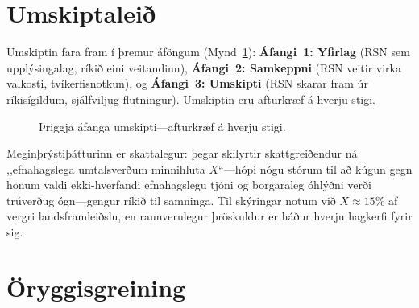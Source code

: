 \documentclass[11pt,a4paper,twocolumn]{article}
\begin{document}
\section{Umskiptaleið}

Umskiptin fara fram í þremur áföngum (Mynd~\ref{fig:migration}): \textbf{Áfangi~1: Yfirlag} (RSN sem upplýsingalag, ríkið eini veitandinn), \textbf{Áfangi~2: Samkeppni} (RSN veitir virka valkosti, tvíkerfisnotkun), og \textbf{Áfangi~3: Umskipti} (RSN skarar fram úr ríkisígildum, sjálfviljug flutningur). Umskiptin eru afturkræf á hverju stigi.

\begin{figure}[ht]
\centering
{}
\caption{Þriggja áfanga umskipti---afturkræf á hverju stigi.}
\label{fig:migration}
\end{figure}

Meginþrýstiþátturinn er skattalegur: þegar skilyrtir skattgreiðendur ná ,,efnahagslega umtalsverðum minnihluta $X$``---hópi nógu stórum til að kúgun gegn honum valdi ekki-hverfandi efnahagslegu tjóni og borgaraleg óhlýðni verði trúverðug ógn---gengur ríkið til samninga. Til skýringar notum við $X \approx 15\%$ af vergri landsframleiðslu, en raunverulegur þröskuldur er háður hverju hagkerfi fyrir sig.

\section{Öryggisgreining}
\end{document}
